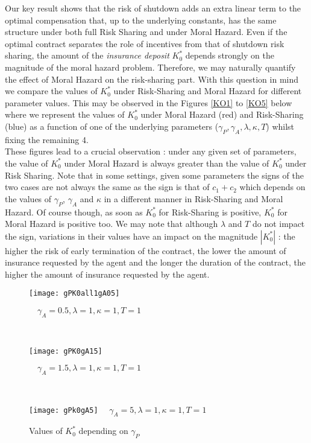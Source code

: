 \documentclass[numbook, envcountsect, envcountsame, envcountreset, runningheads, smallextended]{article}
\begin{document}
Our key result shows that the risk of shutdown adds an extra linear term to the optimal compensation that, up to the underlying constants, has the same structure under both full Risk Sharing and under Moral Hazard.
Even if the optimal contract separates the role of incentives from that of shutdown risk sharing, the amount of the {\it insurance deposit} $K^*_0$ depends strongly on the magnitude of the moral hazard problem. Therefore, we may naturally quantify the effect of Moral Hazard on the risk-sharing part. With this question in mind we compare the values of $K^*_0$ under Risk-Sharing and Moral Hazard for different parameter values.  This may be observed in the Figures \ref{KO1} to \ref{KO5} below where we represent the values of $K^*_0$ under Moral Hazard (red) and Risk-Sharing (blue) as a function of one of the underlying parameters ($\gamma_P, \gamma_A, \lambda, \kappa, T$) whilst fixing the remaining 4. \\


These figures lead to a crucial observation : under any given set of parameters, the value of $K^*_0$ under Moral Hazard is always greater than the value of $K^*_0$ under Risk Sharing. Note that in some settings, given some parameters the signs of the two cases are not always the same as the sign is that of $c_1+c_2$ which depends on the values of $\gamma_P$, $\gamma_A$ and $\kappa$ in a different manner in Risk-Sharing and Moral Hazard. Of course though, as soon as $K_0^*$ for Risk-Sharing is positive,  $K_0^*$ for Moral Hazard is positive too. We may note that although $\lambda$ and $T$ do not impact the sign, variations in their values have an impact on the magnitude $|K_0^*|$ : the higher the risk of early termination of the contract, the lower the amount of insurance requested by the agent and the longer the duration of the contract, the higher the amount of insurance requested by the agent.
\begin{figure}[htp]
\caption{Values of $K_0^*$ depending on $\gamma_P$}
\label{KO1}
\centering
\begin{minipage}{0.31\textwidth}
  \centering
  \texttt{[image: gPK0all1gA05]}
   \par
  \footnotesize{$\quad \gamma_A=0.5, \lambda = 1, \kappa=1, T=1$}
\end{minipage}
~
~
\begin{minipage}{0.31\textwidth}
  \centering
  \texttt{[image: gPK0gA15]} \par
  \footnotesize{$\quad \gamma_A=1.5, \lambda = 1, \kappa=1, T=1$}
  \label{fig:test1}
\end{minipage}%
~
~
\begin{minipage}{0.31\textwidth}
  \centering
  \texttt{[image: gPk0gA5]}
  \footnotesize{$\quad \gamma_A=5, \lambda = 1, \kappa=1, T=1$}
\end{minipage}
\end{figure}
\end{document}
